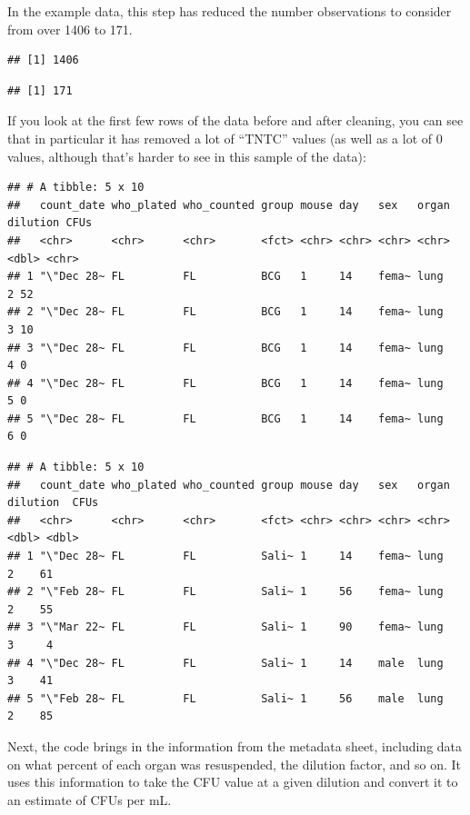 \documentclass[
]{book}
\begin{document}
In the example data, this step has reduced the number observations to consider
from over 1406 to 171.

\begin{verbatim}
## [1] 1406
\end{verbatim}

\begin{verbatim}
## [1] 171
\end{verbatim}

If you look at the first few rows of the data before and after cleaning, you can
see that in particular it has removed a lot of ``TNTC'' values (as well as a lot
of 0 values, although that's harder to see in this sample of the data):

\begin{verbatim}
## # A tibble: 5 x 10
##   count_date who_plated who_counted group mouse day   sex   organ dilution CFUs 
##   <chr>      <chr>      <chr>       <fct> <chr> <chr> <chr> <chr>    <dbl> <chr>
## 1 "\"Dec 28~ FL         FL          BCG   1     14    fema~ lung         2 52   
## 2 "\"Dec 28~ FL         FL          BCG   1     14    fema~ lung         3 10   
## 3 "\"Dec 28~ FL         FL          BCG   1     14    fema~ lung         4 0    
## 4 "\"Dec 28~ FL         FL          BCG   1     14    fema~ lung         5 0    
## 5 "\"Dec 28~ FL         FL          BCG   1     14    fema~ lung         6 0
\end{verbatim}

\begin{verbatim}
## # A tibble: 5 x 10
##   count_date who_plated who_counted group mouse day   sex   organ dilution  CFUs
##   <chr>      <chr>      <chr>       <fct> <chr> <chr> <chr> <chr>    <dbl> <dbl>
## 1 "\"Dec 28~ FL         FL          Sali~ 1     14    fema~ lung         2    61
## 2 "\"Feb 28~ FL         FL          Sali~ 1     56    fema~ lung         2    55
## 3 "\"Mar 22~ FL         FL          Sali~ 1     90    fema~ lung         3     4
## 4 "\"Dec 28~ FL         FL          Sali~ 1     14    male  lung         3    41
## 5 "\"Feb 28~ FL         FL          Sali~ 1     56    male  lung         2    85
\end{verbatim}

Next, the code brings in the information from the metadata sheet, including data on
what percent of each organ was resuspended, the dilution factor, and so on.
It uses this information to take the CFU value at a given dilution and convert
it to an estimate of CFUs per mL.
\end{document}
